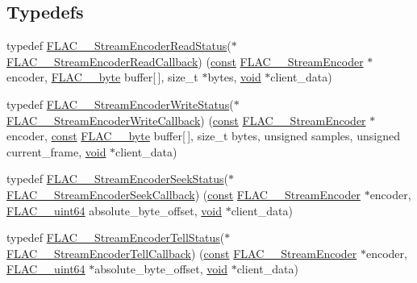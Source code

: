\subsection*{Typedefs}
\begin{DoxyCompactItemize}
\item 
typedef \hyperlink{group__flac__stream__encoder_ga2e81f007fb0a7414c0bbb453f37ea37f}{F\+L\+A\+C\+\_\+\+\_\+\+Stream\+Encoder\+Read\+Status}($\ast$ \hyperlink{group__flac__stream__encoder_ga18b7941b93bae067192732e913536d44}{F\+L\+A\+C\+\_\+\+\_\+\+Stream\+Encoder\+Read\+Callback}) (\hyperlink{zconf_8h_a2c212835823e3c54a8ab6d95c652660e}{const} \hyperlink{struct_f_l_a_c_____stream_encoder}{F\+L\+A\+C\+\_\+\+\_\+\+Stream\+Encoder} $\ast$encoder, \hyperlink{ordinals_8h_a5eb569b12d5b047cdacada4d57924ee3}{F\+L\+A\+C\+\_\+\+\_\+byte} buffer\mbox{[}$\,$\mbox{]}, size\+\_\+t $\ast$bytes, \hyperlink{png_8h_ac9c84fa68bbad002983e35ce3663c686}{void} $\ast$client\+\_\+data)
\item 
typedef \hyperlink{group__flac__stream__encoder_ga3737471fd49730bb8cf9b182bdeda05e}{F\+L\+A\+C\+\_\+\+\_\+\+Stream\+Encoder\+Write\+Status}($\ast$ \hyperlink{group__flac__stream__encoder_ga50865125fd57c40fab6eb2f062651429}{F\+L\+A\+C\+\_\+\+\_\+\+Stream\+Encoder\+Write\+Callback}) (\hyperlink{zconf_8h_a2c212835823e3c54a8ab6d95c652660e}{const} \hyperlink{struct_f_l_a_c_____stream_encoder}{F\+L\+A\+C\+\_\+\+\_\+\+Stream\+Encoder} $\ast$encoder, \hyperlink{zconf_8h_a2c212835823e3c54a8ab6d95c652660e}{const} \hyperlink{ordinals_8h_a5eb569b12d5b047cdacada4d57924ee3}{F\+L\+A\+C\+\_\+\+\_\+byte} buffer\mbox{[}$\,$\mbox{]}, size\+\_\+t bytes, unsigned samples, unsigned current\+\_\+frame, \hyperlink{png_8h_ac9c84fa68bbad002983e35ce3663c686}{void} $\ast$client\+\_\+data)
\item 
typedef \hyperlink{group__flac__stream__encoder_ga6d5be3489f45fcf0c252022c65d87aca}{F\+L\+A\+C\+\_\+\+\_\+\+Stream\+Encoder\+Seek\+Status}($\ast$ \hyperlink{group__flac__stream__encoder_ga70b85349d5242e4401c4d8ddf6d9bbca}{F\+L\+A\+C\+\_\+\+\_\+\+Stream\+Encoder\+Seek\+Callback}) (\hyperlink{zconf_8h_a2c212835823e3c54a8ab6d95c652660e}{const} \hyperlink{struct_f_l_a_c_____stream_encoder}{F\+L\+A\+C\+\_\+\+\_\+\+Stream\+Encoder} $\ast$encoder, \hyperlink{ordinals_8h_aa78c8c70a3eb8a58af7436f278acde8e}{F\+L\+A\+C\+\_\+\+\_\+uint64} absolute\+\_\+byte\+\_\+offset, \hyperlink{png_8h_ac9c84fa68bbad002983e35ce3663c686}{void} $\ast$client\+\_\+data)
\item 
typedef \hyperlink{group__flac__stream__encoder_gab628f63181250eb977a28bf12b7dd9ff}{F\+L\+A\+C\+\_\+\+\_\+\+Stream\+Encoder\+Tell\+Status}($\ast$ \hyperlink{group__flac__stream__encoder_gabefdf2279e1d0347d9f98f46da4e415b}{F\+L\+A\+C\+\_\+\+\_\+\+Stream\+Encoder\+Tell\+Callback}) (\hyperlink{zconf_8h_a2c212835823e3c54a8ab6d95c652660e}{const} \hyperlink{struct_f_l_a_c_____stream_encoder}{F\+L\+A\+C\+\_\+\+\_\+\+Stream\+Encoder} $\ast$encoder, \hyperlink{ordinals_8h_aa78c8c70a3eb8a58af7436f278acde8e}{F\+L\+A\+C\+\_\+\+\_\+uint64} $\ast$absolute\+\_\+byte\+\_\+offset, \hyperlink{png_8h_ac9c84fa68bbad002983e35ce3663c686}{void} $\ast$client\+\_\+data)

\end{DoxyCompactItemize}
